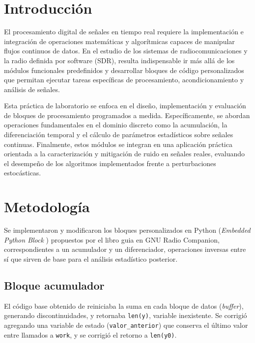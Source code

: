 \documentclass[twocolumn]{IEEEtran}
\begin{document}
\section{Introducción}

El procesamiento digital de señales en tiempo real requiere la implementación e integración de operaciones matemáticas y algorítmicas capaces de manipular flujos continuos de datos. En el estudio de los sistemas de radiocomunicaciones y la radio definida por software (SDR), resulta indispensable ir más allá de los módulos funcionales predefinidos y desarrollar bloques de código personalizados que permitan ejecutar tareas específicas de procesamiento, acondicionamiento y análisis de señales.

Esta práctica de laboratorio se enfoca en el diseño, implementación y evaluación de bloques de procesamiento programados a medida. Específicamente, se abordan operaciones fundamentales en el dominio discreto como la acumulación, la diferenciación temporal y el cálculo de parámetros estadísticos sobre señales continuas. Finalmente, estos módulos se integran en una aplicación práctica orientada a la caracterización y mitigación de ruido en señales reales, evaluando el desempeño de los algoritmos implementados frente a perturbaciones estocásticas.








\section{Metodología}

Se implementaron y modificaron los bloques personalizados en Python (\textit{Embedded Python Block} \cite{wikipediaPythonBlocks}) propuestos por el libro guia\cite{ortega2019comunicaciones} 
en GNU Radio Companion, correspondientes a un acumulador y un diferenciador, 
operaciones inversas entre sí que sirven de base para el análisis estadístico 
posterior.

\subsection{Bloque acumulador}
El código base obtenido de \cite{ortega2019comunicaciones} reiniciaba la suma en cada bloque de datos (\textit{buffer}), 
generando discontinuidades, y retornaba \texttt{len(y)}, variable inexistente. 
Se corrigió agregando una variable de estado (\texttt{valor\_anterior}) que 
conserva el último valor entre llamados a \texttt{work}, y se corrigió el retorno 
a \texttt{len(y0)}.
\end{document}
